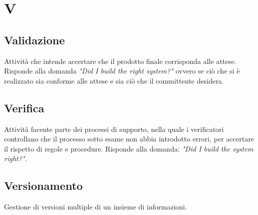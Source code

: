\section*{V}

\subsection{Validazione}
Attività che intende accertare che il prodotto finale corrisponda alle attese. Risponde alla domanda \textit{"Did I build the right system?"} ovvero se ciò che si è realizzato sia conforme alle attese e sia ciò che il committente desidera.

\subsection{Verifica}
Attività facente parte dei processi di supporto, nella quale i verificatori controllano che il processo sotto esame non abbia introdotto errori, per accertare il rispetto di regole e procedure. Risponde alla domanda: \textit{"Did I build the system right?"}.

\subsection{Versionamento}
Gestione di versioni multiple di un insieme di informazioni.
